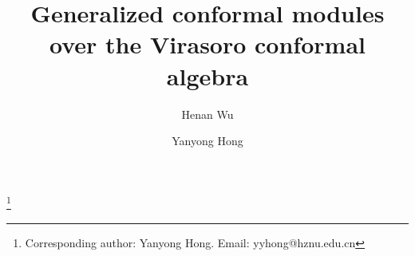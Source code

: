 \documentclass[12pt]{amsart}
\begin{document}
 
 
 
 
 
 
 \nc{\os}{\overline{\fraks}}
 
\nc{\frakTx}{\frakT}      %
\nc{\ox}{\overline{\frakx}} 
 



\title{Generalized conformal modules over the Virasoro conformal algebra}


\author{Henan Wu}
\address{School of Mathematics and Statistics, Shanxi University, Taiyuan 030006, PR China}

\author{Yanyong Hong}
\address{School of Mathematics, Hangzhou Normal University,
Hangzhou 311121, PR China}
\thanks{Corresponding author: Yanyong Hong. Email: yyhong@hznu.edu.cn}


\end{document}
